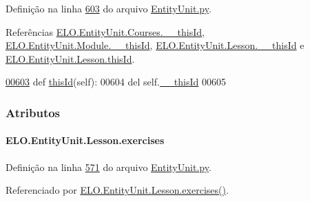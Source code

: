 Definição na linha \hyperlink{EntityUnit_8py_source_l00603}{603} do arquivo \hyperlink{EntityUnit_8py_source}{Entity\+Unit.\+py}.



Referências \hyperlink{EntityUnit_8py_source_l00457}{E\+L\+O.\+Entity\+Unit.\+Courses.\+\_\+\+\_\+this\+Id}, \hyperlink{EntityUnit_8py_source_l00536}{E\+L\+O.\+Entity\+Unit.\+Module.\+\_\+\+\_\+this\+Id}, \hyperlink{EntityUnit_8py_source_l00598}{E\+L\+O.\+Entity\+Unit.\+Lesson.\+\_\+\+\_\+this\+Id} e \hyperlink{classELO_1_1EntityUnit_1_1Lesson_a2ec9bd43b6b7ac7c7d00469c9f586271}{E\+L\+O.\+Entity\+Unit.\+Lesson.\+this\+Id}.


\begin{DoxyCode}
\hypertarget{classELO_1_1EntityUnit_1_1Lesson_l00603}{}\hyperlink{classELO_1_1EntityUnit_1_1Lesson_ad2584991f58cc65ff912aa2f4a4157c9}{00603}     \textcolor{keyword}{def }\hyperlink{classELO_1_1EntityUnit_1_1Lesson_a2ec9bd43b6b7ac7c7d00469c9f586271}{thisId}(self):
00604         del self.\hyperlink{classELO_1_1EntityUnit_1_1Lesson_a9bcefd31ae973d67b22b1854ce5f8a44}{\_\_thisId}
00605 
\end{DoxyCode}


\subsubsection{Atributos}
\hypertarget{classELO_1_1EntityUnit_1_1Lesson_a8d3db8bfbcfd47e9f7eef8f3bdc0ee3f}{}
\paragraph[{exercises}]{\setlength{\rightskip}{0pt plus 5cm}E\+L\+O.\+Entity\+Unit.\+Lesson.\+exercises}\label{classELO_1_1EntityUnit_1_1Lesson_a8d3db8bfbcfd47e9f7eef8f3bdc0ee3f}


Definição na linha \hyperlink{EntityUnit_8py_source_l00571}{571} do arquivo \hyperlink{EntityUnit_8py_source}{Entity\+Unit.\+py}.



Referenciado por \hyperlink{classELO_1_1EntityUnit_1_1Lesson_a2153c6db0d8b1f9d580df9f0d06f122e}{E\+L\+O.\+Entity\+Unit.\+Lesson.\+exercises()}.

\hypertarget{classELO_1_1EntityUnit_1_1Lesson_a5288d46b77e4b0cfd382857ef1b82fba}{}
